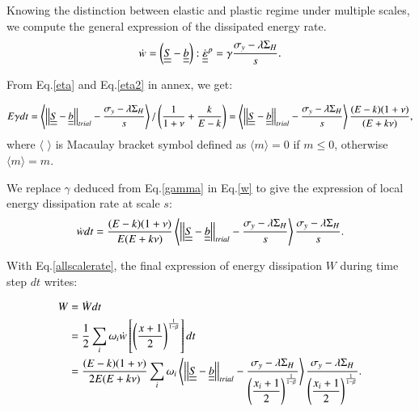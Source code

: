 \documentclass[3p,times,number,review]{elsarticle}
\begin{document}
Knowing the distinction between elastic and plastic regime under multiple scales, we compute the general expression of the dissipated energy rate.
\begin{equation}
\dot{w}=\left( \uline{\uline{S}}-\uline{\uline{b}}\right) :\dot{\uline{\uline{\varepsilon}}}^p=\gamma\dfrac{ \sigma_y-\lambda \Sigma_H}{s}.
\label{w}
\end{equation}

From Eq.\eqref{eta} and Eq.\eqref{eta2} in annex, we get:

\begin{equation}E\gamma dt=\left\langle \left| \left|\uline{\uline{S}}-\uline{\uline{b}}\right| \right|_{trial}-\dfrac{\sigma_y-\lambda \Sigma_H}{s}\right\rangle /\left(\dfrac{1}{1+\nu}+\dfrac{k}{E-k} \right)=\left\langle \left| \left|\uline{\uline{S}}-\uline{\uline{b}}\right| \right|_{trial}-\dfrac{\sigma_y-\lambda \Sigma_H}{s}\right\rangle\dfrac{(E-k)(1+\nu) }{(E+k\nu)},
\label{gamma}
\end{equation}
where $\langle$ $\rangle$ is Macaulay bracket symbol defined as $\langle m\rangle=0$ if $m\leqslant0$, otherwise $\langle m\rangle=m$.

We replace $\gamma$ deduced from Eq.\eqref{gamma} in Eq.\eqref{w} to give the expression of local energy dissipation rate at scale $s$:
\begin{equation}
\dot{w}dt=\dfrac{(E-k)(1+\nu) }{E(E+k\nu)}\left\langle  \left| \left|\uline{\uline{S}}-\uline{\uline{b}}\right| \right|_{trial}-\dfrac{\sigma_y-\lambda \Sigma_H}{s}\right\rangle \dfrac{\sigma_y-\lambda \Sigma_H}{s}.
\label{dW}
\end{equation}

With Eq.\eqref{allscalerate}, the final expression of energy dissipation $W$ during time step $dt$ writes:

\begin{equation}
  \begin{split}
W&=\dot{W}dt
\\&=\frac{1}{2}\sum_{i}\omega_i\dot{w}\left[  \left( \frac{x+1}{2}\right) ^{\frac{1}{1-\beta}}\right]dt
\\&=\dfrac{(E-k)(1+\nu) }{2E(E+k\nu)}\sum_{i}\omega_i\left\langle  \left| \left|\uline{\uline{S}}-\uline{\uline{b}}\right| \right|_{trial}-\dfrac{\sigma_y-\lambda \Sigma_H}{\left( \dfrac{x_i+1}{2}\right) ^{\frac{1}{1-\beta}}}\right\rangle \dfrac{\sigma_y-\lambda \Sigma_H}{\left( \dfrac{x_i+1}{2}\right) ^{\frac{1}{1-\beta}}}.
  \end{split}
\label{finaldw}
\end{equation}
\end{document}
